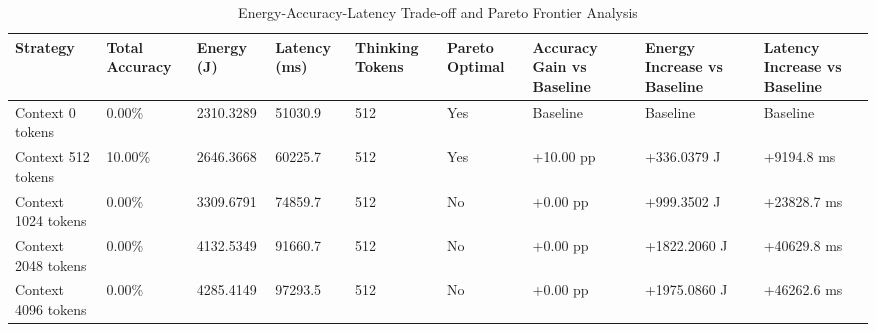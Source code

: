 \begin{table}
\caption{Energy-Accuracy-Latency Trade-off and Pareto Frontier Analysis}
\label{tab:tradeoff_comparison}
\begin{tabular}{lllllllll}
\toprule
Strategy & Total Accuracy & Energy (J) & Latency (ms) & Thinking Tokens & Pareto Optimal & Accuracy Gain vs Baseline & Energy Increase vs Baseline & Latency Increase vs Baseline \\
\midrule
Context 0 tokens & 0.00\% & 2310.3289 & 51030.9 & 512 & Yes & Baseline & Baseline & Baseline \\
Context 512 tokens & 10.00\% & 2646.3668 & 60225.7 & 512 & Yes & +10.00 pp & +336.0379 J & +9194.8 ms \\
Context 1024 tokens & 0.00\% & 3309.6791 & 74859.7 & 512 & No & +0.00 pp & +999.3502 J & +23828.7 ms \\
Context 2048 tokens & 0.00\% & 4132.5349 & 91660.7 & 512 & No & +0.00 pp & +1822.2060 J & +40629.8 ms \\
Context 4096 tokens & 0.00\% & 4285.4149 & 97293.5 & 512 & No & +0.00 pp & +1975.0860 J & +46262.6 ms \\
\bottomrule
\end{tabular}
\end{table}
